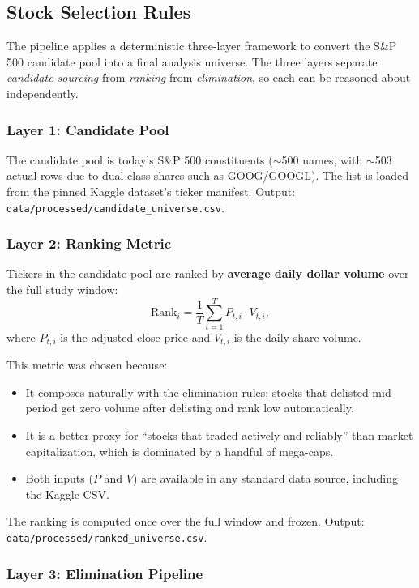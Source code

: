 \documentclass[11pt]{article}
\begin{document}
\subsection{Stock Selection Rules}\label{sec:selection-rules}

The pipeline applies a deterministic three-layer framework to convert the S\&P 500 candidate pool into a final analysis universe. The three layers separate \emph{candidate sourcing} from \emph{ranking} from \emph{elimination}, so each can be reasoned about independently.

\subsubsection{Layer 1: Candidate Pool}

The candidate pool is today's S\&P 500 constituents ($\sim$500 names, with $\sim$503 actual rows due to dual-class shares such as GOOG/GOOGL). The list is loaded from the pinned Kaggle dataset's ticker manifest. Output: \texttt{data/processed/candidate\_universe.csv}.

\subsubsection{Layer 2: Ranking Metric}

Tickers in the candidate pool are ranked by \textbf{average daily dollar volume} over the full study window:
\[
\text{Rank}_i =
\frac{1}{T}
\sum_{t=1}^{T}
P_{t,i} \cdot V_{t,i},
\]
where $P_{t,i}$ is the adjusted close price and $V_{t,i}$ is the daily share volume.

This metric was chosen because:
\begin{itemize}
    \item It composes naturally with the elimination rules: stocks that delisted mid-period get zero volume after delisting and rank low automatically.
    \item It is a better proxy for ``stocks that traded actively and reliably'' than market capitalization, which is dominated by a handful of mega-caps.
    \item Both inputs ($P$ and $V$) are available in any standard data source, including the Kaggle CSV.
\end{itemize}

The ranking is computed once over the full window and frozen. Output: \texttt{data/processed/ranked\_universe.csv}.

\subsubsection{Layer 3: Elimination Pipeline}
\end{document}

